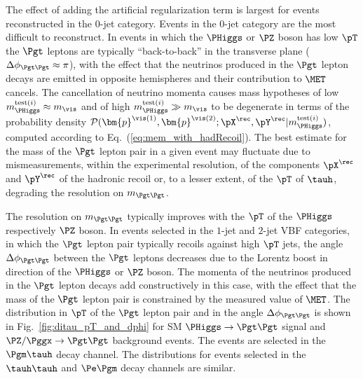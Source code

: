 The effect of adding the artificial regularization term is largest for events reconstructed in the $0$-jet category.
Events in the $0$-jet category are the most difficult to reconstruct.
In events in which the $\PHiggs$ or $\PZ$ boson has low $\pT$
the $\Pgt$ leptons are typically ``back-to-back'' in the transverse plane ($\Delta\phi_{\Pgt\Pgt} \approx \pi$), 
with the effect that the neutrinos produced in the $\Pgt$ lepton decays are emitted in opposite hemispheres and their contribution to $\MET$ cancels.
The cancellation of neutrino momenta causes mass hypotheses of low $m_{\PHiggs}^{\textrm{test}(i)} \approx m_{\vis}$
and of high $m_{\PHiggs}^{\textrm{test}(i)} \gg m_{\vis}$
to be degenerate in terms of the probability density $\mathcal{P}(\bm{p}^{\vis(1)},\bm{p}^{\vis(2)};\pX^{\rec},\pY^{\rec}|m_{\PHiggs}^{\textrm{test}(i)})$,
computed according to Eq.~(\ref{eq:mem_with_hadRecoil}).
The best estimate for the mass of the $\Pgt$ lepton pair in a given event may fluctuate 
due to mismeasurements, within the experimental resolution, of the components $\pX^{\rec}$ and $\pY^{\rec}$ of the hadronic recoil or, to a lesser extent, of the $\pT$ of $\tauh$,
degrading the resolution on $m_{\Pgt\Pgt}$.

The resolution on $m_{\Pgt\Pgt}$ typically improves with the $\pT$ of the $\PHiggs$ respectively $\PZ$ boson.
In events selected in the $1$-jet and $2$-jet VBF categories,
in which the $\Pgt$ lepton pair typically recoils against high $\pT$ jets,
the angle $\Delta\phi_{\Pgt\Pgt}$ between the $\Pgt$ leptons decreases due to the Lorentz boost in direction of the $\PHiggs$ or $\PZ$ boson.
The momenta of the neutrinos produced in the $\Pgt$ lepton decays add constructively in this case,
with the effect that the mass of the $\Pgt$ lepton pair is constrained by the measured value of $\MET$.
The distribution in $\pT$ of the $\Pgt$ lepton pair and in the angle $\Delta\phi_{\Pgt\Pgt}$ is shown in Fig.~\ref{fig:ditau_pT_and_dphi}
for SM $\PHiggs \to \Pgt\Pgt$ signal and $\PZ/\Pggx \to \Pgt\Pgt$ background events.
The events are selected in the $\Pgm\tauh$ decay channel.
The distributions for events selected in the $\tauh\tauh$ and $\Pe\Pgm$ decay channels are similar.

